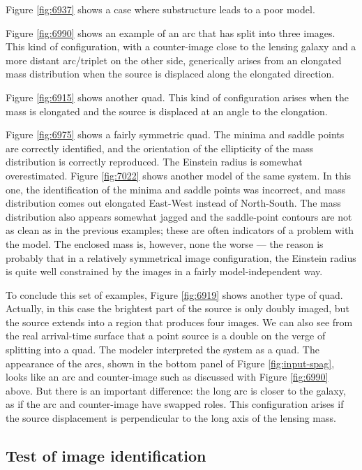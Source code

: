 \documentclass[12pt,preprint]{aastex}
\begin{document}
Figure \ref{fig:6937} shows a case where substructure leads to a
poor model.

Figure \ref{fig:6990} shows an example of an arc that has split into
three images.  This kind of configuration, with a counter-image close
to the lensing galaxy and a more distant arc/triplet on the other
side, generically arises from an elongated mass distribution when the
source is displaced along the elongated direction.

Figure \ref{fig:6915} shows another quad.  This kind of configuration
arises when the mass is elongated and the source is displaced at an
angle to the elongation.

Figure \ref{fig:6975} shows a fairly symmetric quad.  The minima and
saddle points are correctly identified, and the orientation of the
ellipticity of the mass distribution is correctly reproduced.  The
Einstein radius is somewhat overestimated.  Figure \ref{fig:7022}
shows another model of the same system.  In this one, the
identification of the minima and saddle points was incorrect, and mass
distribution comes out elongated East-West instead of North-South.
The mass distribution also appears somewhat jagged and the
saddle-point contours are not as clean as in the previous examples;
these are often indicators of a problem with the model.  The enclosed
mass is, however, none the worse --- the reason is probably that in a
relatively symmetrical image configuration, the Einstein radius is quite
well constrained by the images in a fairly model-independent way.

To conclude this set of examples, Figure \ref{fig:6919} shows another
type of quad.  Actually, in this case the brightest part of the source
is only doubly imaged, but the source extends into a region that
produces four images.  We can also see from the real arrival-time
surface that a point source is a double on the verge of splitting into
a quad.  The modeler interpreted the system as a quad.  The
appearance of the arcs, shown in the bottom panel of Figure
\ref{fig:input-spag}, looks like an arc and counter-image such as
discussed with Figure \ref{fig:6990} above.  But there is an important
difference: the long arc is closer to the galaxy, as if the arc and
counter-image have swapped roles.  This configuration arises if the
source displacement is perpendicular to the long axis of the lensing
mass.

\subsection{Test of image identification} \label{sec:tests.t1}
\end{document}

